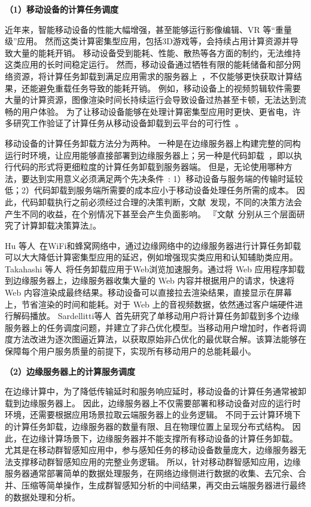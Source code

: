 \textbf{（1）移动设备的计算任务调度}

近年来，智能移动设备的性能大幅增强，甚至能够运行影像编辑、VR 等“重量级”应用。
然而这类计算密集型应用，包括3D游戏等，会持续占用计算资源并导致大量的能耗开销。
移动设备受到能耗、性能、散热等各方面的制约，无法维持这类应用的长时间稳定运行。
然而，移动设备通过牺牲有限的能耗储备和部分网络资源，将计算任务卸载到满足应用需求的服务器上~\cite{DBLP:conf/ispa/KovachevYK12}，不仅能够更快获取计算结果，还能避免重载任务导致的能耗开销。
例如，移动设备上的视频剪辑软件需要大量的计算资源，图像渲染时间长持续运行会导致设备过热甚至卡顿，无法达到流畅的用户体验。
为了让移动设备能够在处理计算密集型应用时更快、更省电，许多研究工作验证了计算任务从移动设备卸载到云平台的可行性~\cite{DBLP:conf/secon/HassanXWC15,DBLP:journals/pervasive/SatyanarayananBCD09,DBLP:journals/computer/KumarL10}。

移动设备的计算任务卸载方法分为两种。
一种是在边缘服务器上构建完整的同构运行时环境，让应用能够直接部署到边缘服务器上；另一种是代码卸载~\cite{DBLP:conf/mobisys/CuervoBCWSCB10}，即以执行代码的形式将更细粒度的计算任务卸载到服务器端。
但是，无论使用哪种方法，要达到实用意义必须满足两个先决条件~\cite{Flores:2017bv}: 1）移动设备与服务端的传输时延较低；2）代码卸载到服务端所需要的成本应小于移动设备处理任务所需的成本。
因此，代码卸载执行之前必须经过合理的决策判断，文献~发现，不同的决策方法会产生不同的收益，在个别情况下甚至会产生负面影响。
『文献~分别从三个层面研究了计算卸载决策算法』。

Hu 等人~\cite{DBLP:conf/apsys/HuGHWACPS16}在WiFi和蜂窝网络中，通过边缘网络中的边缘服务器进行计算任务卸载可以大大降低计算密集型应用的延迟，例如增强现实类应用和认知辅助类应用。
Takahashi 等人~\cite{DBLP:conf/mobilecloud/TakahashiTK15}将任务卸载应用于Web浏览加速服务。通过将 Web 应用程序卸载到边缘服务器上，边缘服务器收集大量的 Web 内容并根据用户的请求，快速将 Web 内容渲染成最终结果。移动设备可以直接拉去渲染结果，直接显示在屏幕上，节省渲染的时间和能耗。对于 Web 上的音视频数据，依然通过客户端硬件进行解码播放。
Sardellitti等人~\cite{DBLP:journals/tsipn/SardellittiSB15}首先研究了单移动用户将计算任务卸载到多个边缘服务器上的任务调度问题，并建立了非凸优化模型。当移动用户增加时，作者将调度方法改进为逐次图逼近算法，以获取原始非凸优化的最优联合解。该算法能够在保障每个用户服务质量的前提下，实现所有移动用户的总能耗最小。

\textbf{（2）边缘服务器上的计算服务调度}

在边缘计算中，为了降低传输延时和服务响应延时，移动设备的计算任务通常被卸载到边缘服务器上。
因此，边缘服务器上不仅需要部署和移动设备对应的运行时环境，还需要根据应用场景拉取云端服务器上的业务逻辑。
不同于云计算环境下的计算任务卸载，边缘服务器的数量有限、且在物理位置上呈现分布式结构。
因此，在边缘计算场景下，边缘服务器并不能支撑所有移动设备的计算任务卸载。
尤其是在移动群智感知应用中，参与感知任务的移动设备数量庞大，边缘服务器无法支撑移动群智感知应用的完整业务逻辑。
所以，针对移动群智感知应用，边缘服务器通常部署简单的数据处理服务，在网络边缘侧进行数据的收集、去冗余、合并、压缩等简单操作，生成群智感知分析的中间结果，再交由云端服务器进行最终的数据处理和分析。

